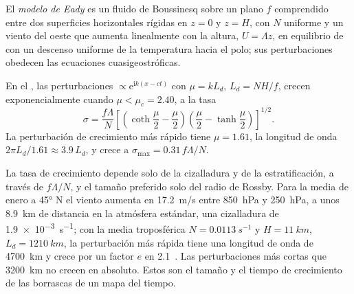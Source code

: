 \begin{definition}\label{def:b3:atmospheric-dynamics:eady}
El \emph{modelo de Eady} es un fluido de Boussinesq sobre un
plano $f$ comprendido entre dos superficies horizontales rígidas en $z = 0$ y $z = H$, con
 $N$ uniforme y un viento del oeste que aumenta linealmente
con la altura, $U = \Lambda z$, en equilibrio de  con un
descenso uniforme de la temperatura hacia el polo; sus perturbaciones obedecen las
ecuaciones cuasigeostróficas.
\end{definition}

\begin{theorem}\label{thm:b3:atmospheric-dynamics:eady}
En el , las perturbaciones $\propto \mathrm e^{\mathrm ik(x - ct)}$
con $\mu = kL_d$, $L_d = NH/f$, crecen exponencialmente cuando $\mu < \mu_c =
2.40$, a la tasa
\[
\sigma = \frac{f\Lambda}{N}\left[\left(\coth\frac{\mu}{2} - \frac{\mu}{2}\right)\left(\frac{\mu}{2} - \tanh\frac{\mu}{2}\right)\right]^{1/2} .
\]
La perturbación de crecimiento más rápido tiene $\mu = 1.61$, la longitud de onda $2\pi L_d/1.61
\approx 3.9\,L_d$, y crece a $\sigma_{\max} = 0.31\,f\Lambda/N$.
\end{theorem}
\admitted

La tasa de crecimiento depende solo de la cizalladura y de la estratificación, a través de
$f\Lambda/N$, y el tamaño preferido solo del radio de Rossby. Para la
media de enero a \ang{45} N el viento aumenta en \qty{17.2}{m/s} entre
\qty{850}{hPa} y \qty{250}{hPa}, a unos \qty{8.9}{km} de distancia en la
atmósfera estándar, una cizalladura de \qty{1.9e-3}{s^{-1}}; con la media
troposférica $N = \qty{0.0113}{s^{-1}}$ y $H = \qty{11}{km}$, $L_d =
\qty{1210}{km}$, la perturbación más rápida tiene una longitud de onda de \qty{4700}{km}
y crece por un factor $e$ en \num{2.1}~. Las perturbaciones más cortas que
\qty{3200}{km} no crecen en absoluto. Estos son el tamaño y el tiempo de crecimiento de
las borrascas de un mapa del tiempo.

